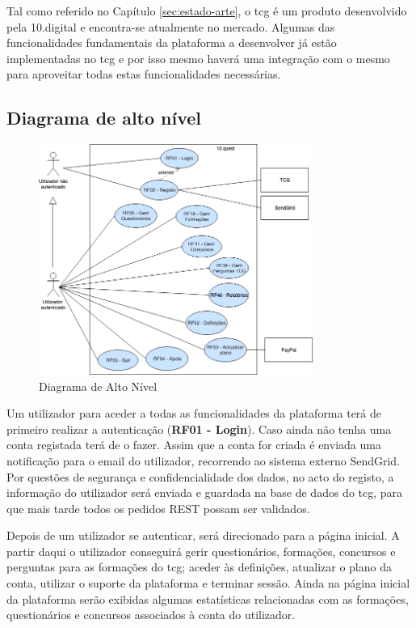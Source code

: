 Tal como referido no Capítulo \ref{sec:estado-arte}, o \acrshort{tcg} é um produto desenvolvido pela 10.digital e encontra-se atualmente no mercado. Algumas das funcionalidades fundamentais da plataforma a desenvolver já estão implementadas no \acrshort{tcg}  e por isso mesmo haverá uma integração com o mesmo para aproveitar todas estas funcionalidades necessárias.


\newpage

\subsection{Diagrama de alto nível}
\label{d:altonivel}
\begin{figure}[ht!]
	\begin{center}
		\includegraphics[width=0.8\textwidth]{img/rf/alto-nivel}
		\caption{Diagrama de Alto Nível}
		\label{fig:rf-alto-nivel}
	\end{center}
\end{figure}

Um utilizador para aceder a todas as funcionalidades da plataforma terá de primeiro realizar a autenticação (\textbf{RF01 - Login}). Caso ainda não tenha uma conta registada terá de o fazer. Assim que a conta for criada é enviada uma notificação para o email do utilizador, recorrendo ao sistema externo SendGrid. Por questões de segurança e confidencialidade dos dados, no acto do registo, a informação do utilizador será enviada e guardada na base de dados do \acrshort{tcg}, para que mais tarde todos os pedidos REST possam ser validados.

Depois de um utilizador se autenticar, será direcionado para a página inicial. A partir daqui o utilizador conseguirá gerir questionários, formações, concursos e perguntas para as formações do \acrshort{tcg}; aceder às definições, atualizar o plano da conta, utilizar o suporte da plataforma e terminar sessão.
Ainda na página inicial da plataforma serão exibidas algumas estatísticas relacionadas com as formações, questionários e concursos associados à conta do utilizador. 

